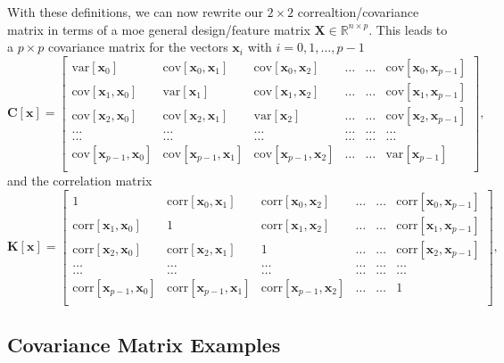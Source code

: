 \documentclass[%
oneside,                 %
final,                   %
10pt]{article}
\begin{document}
With these definitions, we can now rewrite our $2\times 2$ correaltion/covariance matrix in terms of a moe general design/feature matrix $\bm{X}\in {\mathbb{R}}^{n\times p}$. This leads to a $p\times p$ covariance matrix for the vectors $\bm{x}_i$ with $i =0,1,\dots,p-1$
\[
\bm{C}[\bm{x}] = \begin{bmatrix}
\mathrm{var}[\bm{x}_0] & \mathrm{cov}[\bm{x}_0,\bm{x}_1]  & \mathrm{cov}[\bm{x}_0,\bm{x}_2] & \dots & \dots & \mathrm{cov}[\bm{x}_0,\bm{x}_{p-1}]\\
\mathrm{cov}[\bm{x}_1,\bm{x}_0] & \mathrm{var}[\bm{x}_1]  & \mathrm{cov}[\bm{x}_1,\bm{x}_2] & \dots & \dots & \mathrm{cov}[\bm{x}_1,\bm{x}_{p-1}]\\
\mathrm{cov}[\bm{x}_2,\bm{x}_0]   & \mathrm{cov}[\bm{x}_2,\bm{x}_1] & \mathrm{var}[\bm{x}_2] & \dots & \dots & \mathrm{cov}[\bm{x}_2,\bm{x}_{p-1}]\\
\dots & \dots & \dots & \dots & \dots & \dots \\
\dots & \dots & \dots & \dots & \dots & \dots \\
\mathrm{cov}[\bm{x}_{p-1},\bm{x}_0]   & \mathrm{cov}[\bm{x}_{p-1},\bm{x}_1] & \mathrm{cov}[\bm{x}_{p-1},\bm{x}_{2}]  & \dots & \dots  & \mathrm{var}[\bm{x}_{p-1}]\\
\end{bmatrix},
\]
and the correlation matrix
\[
\bm{K}[\bm{x}] = \begin{bmatrix}
1 & \mathrm{corr}[\bm{x}_0,\bm{x}_1]  & \mathrm{corr}[\bm{x}_0,\bm{x}_2] & \dots & \dots & \mathrm{corr}[\bm{x}_0,\bm{x}_{p-1}]\\
\mathrm{corr}[\bm{x}_1,\bm{x}_0] & 1  & \mathrm{corr}[\bm{x}_1,\bm{x}_2] & \dots & \dots & \mathrm{corr}[\bm{x}_1,\bm{x}_{p-1}]\\
\mathrm{corr}[\bm{x}_2,\bm{x}_0]   & \mathrm{corr}[\bm{x}_2,\bm{x}_1] & 1 & \dots & \dots & \mathrm{corr}[\bm{x}_2,\bm{x}_{p-1}]\\
\dots & \dots & \dots & \dots & \dots & \dots \\
\dots & \dots & \dots & \dots & \dots & \dots \\
\mathrm{corr}[\bm{x}_{p-1},\bm{x}_0]   & \mathrm{corr}[\bm{x}_{p-1},\bm{x}_1] & \mathrm{corr}[\bm{x}_{p-1},\bm{x}_{2}]  & \dots & \dots  & 1\\
\end{bmatrix},
\]


\subsection*{Covariance Matrix Examples}
\end{document}
